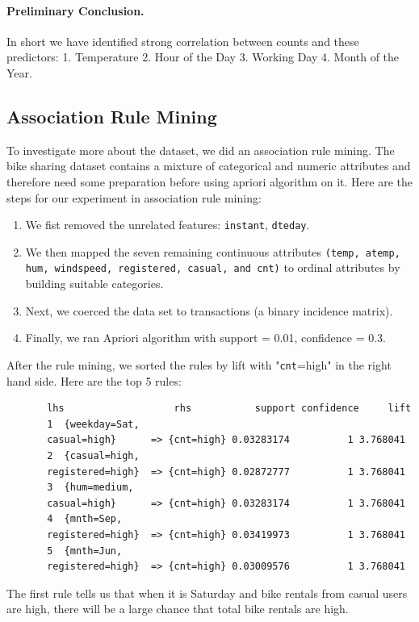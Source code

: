 \documentclass[12pt]{article}
\begin{document}
	\paragraph*{Preliminary Conclusion.}	
	In short we have identified strong correlation between counts and these predictors: 1. Temperature 2. Hour of the Day 3. Working Day 4. Month of the Year. 
	
	\subsection{Association Rule Mining}	
	To investigate more about the dataset, we did an association rule mining. The bike sharing dataset contains a mixture of categorical and numeric attributes and therefore need some preparation before using apriori algorithm on it. Here are the steps for our experiment in association rule mining:
    \begin{enumerate}
    	\item We fist removed the unrelated features: \texttt{instant}, \texttt{dteday}.
    	\item We then mapped the seven remaining continuous attributes \texttt{(temp, atemp, hum, windspeed, registered, casual, and cnt)} to ordinal attributes by building suitable categories.
    	\item Next, we coerced the data set to transactions (a binary incidence matrix).
    	\item Finally, we ran Apriori algorithm with support = 0.01, confidence = 0.3.
    \end{enumerate}
	
	After the rule mining, we sorted the rules by lift with "\texttt{cnt}=high" in the right hand side. Here are the top 5 rules: \color{blue}
	\begin{verbatim}
	   lhs                   rhs           support confidence     lift
	   1  {weekday=Sat,                                                  
	   casual=high}      => {cnt=high} 0.03283174          1 3.768041
	   2  {casual=high,                                                  
	   registered=high}  => {cnt=high} 0.02872777          1 3.768041
	   3  {hum=medium,                                                   
	   casual=high}      => {cnt=high} 0.03283174          1 3.768041
	   4  {mnth=Sep,                                                     
	   registered=high}  => {cnt=high} 0.03419973          1 3.768041
	   5  {mnth=Jun,                                                     
	   registered=high}  => {cnt=high} 0.03009576          1 3.768041
	\end{verbatim} \color{black}
    The first rule tells us that when it is Saturday and bike rentals from casual users are high, there will be a large chance that total bike rentals are high.
    
\end{document}
